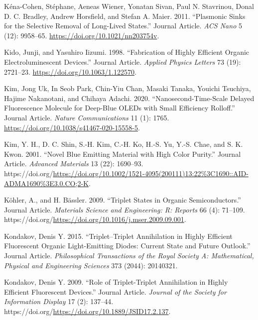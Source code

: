 \documentclass[
  letterpaper,
  DIV=11,
  numbers=noendperiod,
  oneside]{scrreprt}
\newlength{\cslhangindent}
\newlength{\cslentryspacingunit} %
\newenvironment{CSLReferences}[2] %
 {%
  \setlength{\parindent}{0pt}
  \ifodd #1
  \let\oldpar\par
  \def\par{\hangindent=\cslhangindent\oldpar}
  \fi
  \setlength{\parskip}{#2\cslentryspacingunit}
 }%
 {}
\begin{document}
\begin{CSLReferences}{1}{0}
\leavevmode{}%
Kéna-Cohen, Stéphane, Aeneas Wiener, Yonatan Sivan, Paul N. Stavrinou,
Donal D. C. Bradley, Andrew Horsfield, and Stefan A. Maier. 2011.
{``Plasmonic Sinks for the Selective Removal of Long-Lived States.''}
Journal Article. \emph{ACS Nano} 5 (12): 9958--65.
\url{https://doi.org/10.1021/nn203754v}.

\leavevmode{}%
Kido, Junji, and Yasuhiro Iizumi. 1998. {``Fabrication of Highly
Efficient Organic Electroluminescent Devices.''} Journal Article.
\emph{Applied Physics Letters} 73 (19): 2721--23.
\url{https://doi.org/10.1063/1.122570}.

\leavevmode{}%
Kim, Jong Uk, In Seob Park, Chin-Yiu Chan, Masaki Tanaka, Youichi
Tsuchiya, Hajime Nakanotani, and Chihaya Adachi. 2020.
{``Nanosecond-Time-Scale Delayed Fluorescence Molecule for Deep-Blue
OLEDs with Small Efficiency Rolloff.''} Journal Article. \emph{Nature
Communications} 11 (1): 1765.
\url{https://doi.org/10.1038/s41467-020-15558-5}.

\leavevmode{}%
Kim, Y. H., D. C. Shin, S.-H. Kim, C.-H. Ko, H.-S. Yu, Y.-S. Chae, and
S. K. Kwon. 2001. {``Novel Blue Emitting Material with High Color
Purity.''} Journal Article. \emph{Advanced Materials} 13 (22): 1690--93.
https://doi.org/\url{https://doi.org/10.1002/1521-4095(200111)13:22\%3C1690::AID-ADMA1690\%3E3.0.CO;2-K}.

\leavevmode{}%
Köhler, A., and H. Bässler. 2009. {``Triplet States in Organic
Semiconductors.''} Journal Article. \emph{Materials Science and
Engineering: R: Reports} 66 (4): 71--109.
https://doi.org/\url{https://doi.org/10.1016/j.mser.2009.09.001}.

\leavevmode{}%
Kondakov, Denis Y. 2015. {``Triplet--Triplet Annihilation in Highly
Efficient Fluorescent Organic Light-Emitting Diodes: Current State and
Future Outlook.''} Journal Article. \emph{Philosophical Transactions of
the Royal Society A: Mathematical, Physical and Engineering Sciences}
373 (2044): 20140321.

\leavevmode{}%
Kondakov, Denis Y. 2009. {``Role of Triplet-Triplet Annihilation in
Highly Efficient Fluorescent Devices.''} Journal Article. \emph{Journal
of the Society for Information Display} 17 (2): 137--44.
https://doi.org/\url{https://doi.org/10.1889/JSID17.2.137}.


\end{CSLReferences}
\end{document}
